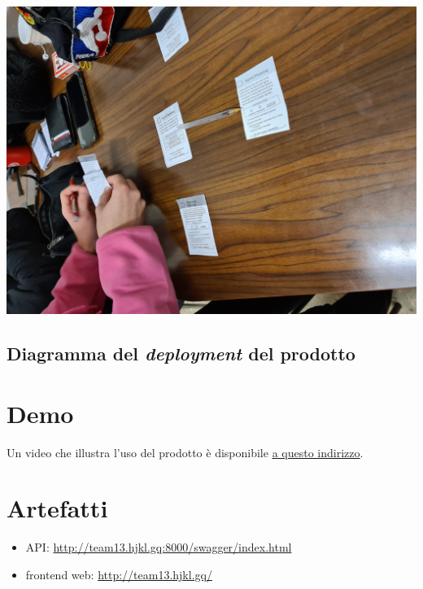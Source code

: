 \documentclass{article}
\begin{document}
\includegraphics[width=\textwidth]{essence-4-4}

\subsection{Diagramma del \emph{deployment} del prodotto}

\section{Demo}

Un video che illustra l'uso del prodotto è disponibile
\underline{\href{https://liveunibo-my.sharepoint.com/:v:/g/personal/federica_grisendi_studio_unibo_it/EaOojpKKw9ZIreuXeDcHFicBxvcOjSGP4zPOGXMwKPtEcA?e=QVfOKm}{a questo indirizzo}}.

\section{Artefatti}

\begin{itemize}
	\item API: \url{http://team13.hjkl.gq:8000/swagger/index.html}
	\item frontend web: \url{http://team13.hjkl.gq/}
\end{itemize}
\end{document}
